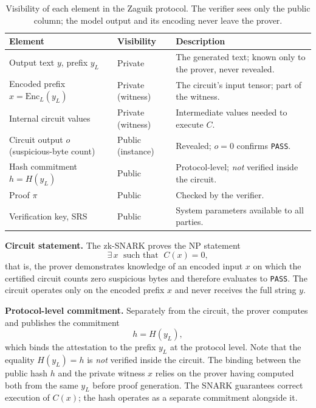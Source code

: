 \begin{table}[htbp]
\centering
\caption{Visibility of each element in the Zaguik protocol. The verifier sees only the public column; the model output and its encoding never leave the prover.}
\label{tab:visibility}
\footnotesize
\begin{tabular}{l l p{6.2cm}}
\hline
\hline
Element & Visibility & Description \\
\hline
Output text $y$, prefix $y_L$ & Private & The generated text; known only to the prover, never revealed. \\
Encoded prefix $x = \mathrm{Enc}_L(y_L)$ & Private (witness) & The circuit's input tensor; part of the witness. \\
Internal circuit values & Private (witness) & Intermediate values needed to execute $C$. \\
Circuit output $o$ (suspicious-byte count) & Public (instance) & Revealed; $o = 0$ confirms \texttt{PASS}. \\
Hash commitment $h = H(y_L)$ & Public & Protocol-level; \emph{not} verified inside the circuit. \\
Proof $\pi$ & Public & Checked by the verifier. \\
Verification key, SRS & Public & System parameters available to all parties. \\
\hline
\hline
\end{tabular}
\end{table}

\medskip

\textbf{Circuit statement.} The zk-SNARK proves the NP statement
\[
    \exists\, x \;\text{ such that }\; C(x) = 0,
\]
that is, the prover demonstrates knowledge of an encoded input $x$ on which the certified circuit counts zero suspicious bytes and therefore evaluates to \texttt{PASS}. The circuit operates only on the encoded prefix $x$ and never receives the full string $y$.

\medskip

\textbf{Protocol-level commitment.} Separately from the circuit, the prover computes and publishes the commitment
\[
    h = H(y_L),
\]
which binds the attestation to the prefix $y_L$ at the protocol level. Note that the equality $H(y_L) = h$ is \emph{not} verified inside the circuit. The binding between the public hash $h$ and the private witness $x$ relies on the prover having computed both from the same $y_L$ before proof generation. The SNARK guarantees correct execution of $C(x)$; the hash operates as a separate commitment alongside it.

